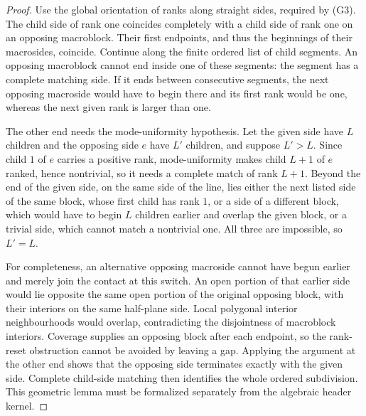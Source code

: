 \documentclass[11pt,a4paper]{article}
\theoremstyle{remark}
\begin{document}
\begin{proof}
Use the global orientation of ranks along straight sides, required by (G3).
The child side
of rank one coincides completely with a child side of rank one on an
opposing macroblock. Their first endpoints, and thus the beginnings of
their macrosides, coincide. Continue along the finite ordered list of child
segments. An opposing macroblock cannot end inside one of these segments:
the segment has a complete matching side. If it ends between consecutive
segments, the next opposing macroside would have to begin there and its
first rank would be one, whereas the next given rank is larger than one.

The other end needs the mode-uniformity hypothesis. Let the given side
have $L$ children and the opposing side $e$ have $L'$ children, and suppose
$L'>L$. Since child $1$ of $e$ carries a positive rank, mode-uniformity
makes child $L+1$ of $e$ ranked, hence nontrivial, so it needs a complete
match of rank $L+1$. Beyond the end of the given side, on the same side of
the line, lies either the next listed side of the same block, whose first
child has rank $1$, or a side of a different block, which would have to
begin $L$ children earlier and overlap the given block, or a trivial side,
which cannot match a nontrivial one. All three are impossible, so $L'=L$.

For completeness, an alternative opposing macroside cannot have begun
earlier and merely join the contact at this switch. An open portion of that
earlier side would lie opposite the same open portion of the original
opposing block, with their interiors on the same half-plane side. Local
polygonal interior neighbourhoods would overlap, contradicting the
disjointness of macroblock interiors. Coverage supplies an opposing block
after each endpoint, so the rank-reset obstruction cannot be avoided by
leaving a gap. Applying the argument at the other end shows that the
opposing side terminates exactly with the given side. Complete child-side
matching then identifies the whole ordered subdivision. This geometric
lemma must be formalized separately from the algebraic header kernel.
\end{proof}
\end{document}
